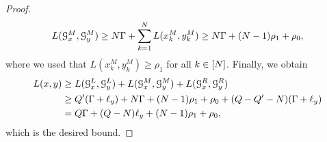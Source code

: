 \begin{proof}
\[
L(\mathcal{G}^M_x, \mathcal{G}^M_y) \geq N\Gamma + \sum_{k=1}^N L(x^M_k, y^M_k) \geq N\Gamma + (N-1)\rho_1 + \rho_0,
\]
where we used that $L(x^M_k, y^M_k) \geq \rho_1$ for all $k \in [N]$.
Finally, we obtain
\begin{align*}
L(x,y) &\geq L(\mathcal{G}^L_x, \mathcal{G}^L_y) + L(\mathcal{G}^M_x, \mathcal{G}^M_y) + L(\mathcal{G}^R_x, \mathcal{G}^R_y)\\
	&\geq Q'(\Gamma + \ell_y) + N\Gamma + (N-1)\rho_1 + \rho_0 + (Q - Q' - N)(\Gamma + \ell_y) \\
	&= Q\Gamma + (Q-N)\ell_y + (N-1)\rho_1 + \rho_0,
\end{align*}
which is the desired bound.
\end{proof}
